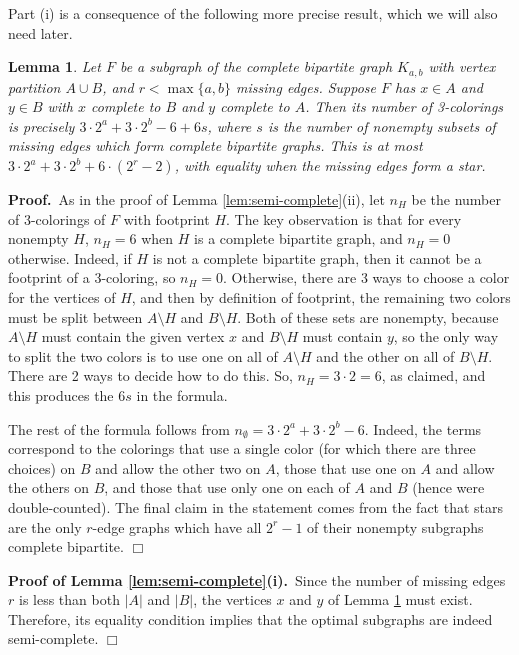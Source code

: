\documentclass[11pt]{article}
\newtheorem{lemma}[theorem]{Lemma}
\begin{document}
Part (i) is a consequence of the following more precise result, which
we will also need later.

\begin{lemma}
  \label{lem:subgraph-bipartite:q=3}
  Let $F$ be a subgraph of the complete bipartite graph $K_{a,b}$ with
  vertex partition $A \cup B$, and $r < \max\{a, b\}$ missing
  edges.  Suppose $F$ has $x \in A$ and $y \in B$ with $x$ complete to
  $B$ and $y$ complete to $A$.  Then its number of 3-colorings is
  precisely $3 \cdot 2^a + 3 \cdot 2^b - 6 + 6s$, where $s$ is
  the number of nonempty subsets of missing edges which form complete
  bipartite graphs.  This is at most $3 \cdot 2^a + 3 \cdot 2^b +
  6 \cdot (2^r-2)$, with equality when the missing edges form a star.
\end{lemma}

\noindent \textbf{Proof.}\, As in the proof of Lemma
\ref{lem:semi-complete}(ii), let $n_H$ be the number of 3-colorings of
$F$ with footprint $H$.  The key observation is that for every
nonempty $H$, $n_H = 6$ when $H$ is a complete bipartite graph, and
$n_H = 0$ otherwise.  Indeed, if $H$ is not a complete bipartite
graph, then it cannot be a footprint of a 3-coloring, so $n_H = 0$.
Otherwise, there are 3 ways to choose a color for the vertices of $H$,
and then by definition of footprint, the remaining two colors must be
split between $A \setminus H$ and $B \setminus H$.  Both of these sets
are nonempty, because $A \setminus H$ must contain the given vertex
$x$ and $B \setminus H$ must contain $y$, so the only way to split the
two colors is to use one on all of $A \setminus H$ and the other on
all of $B \setminus H$.  There are 2 ways to decide how to do this.
So, $n_H = 3 \cdot 2 = 6$, as claimed, and this produces the $6s$ in
the formula.

The rest of the formula follows from $n_\emptyset = 3 \cdot 2^a +
3 \cdot 2^b - 6$.  Indeed, the terms correspond to the colorings
that use a single color (for which there are three choices) on $B$ and
allow the other two on $A$, those that use one on $A$ and allow the
others on $B$, and those that use only one on each of $A$ and $B$
(hence were double-counted).  The final claim in the statement comes
from the fact that stars are the only $r$-edge graphs which have all
$2^r-1$ of their nonempty subgraphs complete bipartite. \hfill $\Box$


\vspace{3mm}

\noindent \textbf{Proof of Lemma \ref{lem:semi-complete}(i).}\, Since
the number of missing edges $r$ is less than both $|A|$ and $|B|$, the
vertices $x$ and $y$ of Lemma \ref{lem:subgraph-bipartite:q=3} must
exist.  Therefore, its equality condition implies that the optimal
subgraphs are indeed semi-complete. \hfill $\Box$
\end{document}
